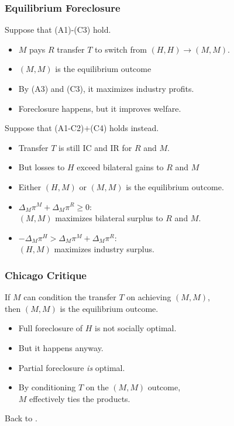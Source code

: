 \documentclass[aspectratio=169,11pt]{beamer}
\begin{document}
\begin{frame}
\frametitle{Equilibrium Foreclosure}
\small
Suppose that (A1)-(C3) hold. 
\begin{itemize}
\item $M$ pays $R$ transfer $T$ to switch from $(H,H) \rightarrow (M,M)$.
\item $(M,M)$ is the equilibrium outcome 
\item By (A3) and (C3), it maximizes industry profits.
\item Foreclosure happens, but it improves welfare. %
\end{itemize}
\pause
Suppose that (A1-C2)$+$(C4) holds instead.
\begin{itemize}
\item Transfer $T$ is still IC and IR for $R$ and $M$.
\item But losses to $H$ exceed bilateral gains to $R$ and $M$
\item Either $(H,M)$ or $(M,M)$ is the equilibrium outcome.
\item $\Delta_M \pi^M + \Delta_M \pi^R \geq 0$:\\ 
$(M,M)$ maximizes \alert{bilateral surplus} to $R$ and $M$.
\item $-\Delta_M \pi^H  > \Delta_M \pi^M + \Delta_M \pi^R$: \\
$(H,M)$ maximizes \alert{industry surplus}.
\end{itemize}
\end{frame}

\begin{frame}
\frametitle{Chicago Critique}

If $M$ can condition the transfer $T$ on achieving $(M,M)$, \\
then $(M,M)$ is the equilibrium outcome.
\begin{itemize}
\item Full foreclosure of $H$ is \alert{not socially optimal}.
\item But it happens anyway.  
\item Partial foreclosure {\it is} optimal.
\item By conditioning $T$ on the $(M,M)$ outcome, \\ $M$ effectively ties the products.
\end{itemize}
Back to \hyperlink{intuition}{}.
\end{frame}
\end{document}
